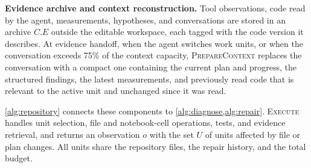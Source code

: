 \textbf{Evidence archive and context reconstruction.} Tool observations, code read by the agent, measurements, hypotheses, and conversations are stored in an archive $C.E$ outside the editable workspace, each tagged with the code version it describes. At evidence handoff, when the agent switches work units, or when the conversation exceeds 75\% of the context capacity, \textsc{PrepareContext} replaces the conversation with a compact one containing the current plan and progress, the structured findings, the latest measurements, and previously read code that is relevant to the active unit and unchanged since it was read.

\cref{alg:repository} connects these components to \cref{alg:diagnose,alg:repair}. \textsc{Execute} handles unit selection, file and notebook-cell operations, tests, and evidence retrieval, and returns an observation $o$ with the set $U$ of units affected by file or plan changes. All units share the repository files, the repair history, and the total budget.
